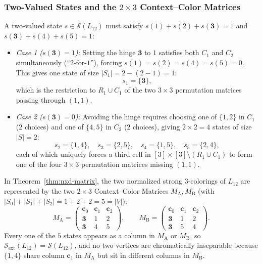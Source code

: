\documentclass[aps,pra,reprint,superscriptaddress,longbibliography,nofootinbib,floatfix,10pt]{revtex4-2}
\theoremstyle{definition}\newtheorem{definition}[theorem]{Definition}
\theoremstyle{remark}\newtheorem{remark}[theorem]{Remark}
\newcommand{\Sc}{\mathcal S}\newcommand{\Cc}{\mathcal C}
\begin{document}
\subsubsection{Two-Valued States and the \texorpdfstring{$2\times 3$}{2x3} Context--Color Matrices}
A two-valued state $s\in\Sc(L_{12})$ must satisfy $s(1)+s(2)+s(\mathbf{3})=1$ and $s(\mathbf{3})+s(4)+s(5)=1$:
\begin{itemize}
\item \emph{Case 1 ($s(\mathbf{3})=1$):} Setting the hinge $\mathbf{3}$ to $1$ satisfies both $C_1$ and $C_2$ simultaneously (``$2$-for-$1$''), forcing $s(1)=s(2)=s(4)=s(5)=0$. This gives one state of size $|S_1|=2-(2-1)=1$:
\[
s_1=\{\mathbf{3}\},
\]
which is the restriction to $R_1\cup C_1$ of the two $3\times 3$ permutation matrices passing through $(1,1)$.
\item \emph{Case 2 ($s(\mathbf{3})=0$):} Avoiding the hinge requires choosing one of $\{1,2\}$ in $C_1$ ($2$ choices) and one of $\{4,5\}$ in $C_2$ ($2$ choices), giving $2\times 2=4$ states of size $|S|=2$:
\[
s_2=\{1,4\},\quad s_3=\{2,5\},\quad s_4=\{1,5\},\quad s_5=\{2,4\},
\]
each of which uniquely forces a third cell in $[3]\times[3]\setminus(R_1\cup C_1)$ to form one of the four $3\times 3$ permutation matrices missing $(1,1)$.
\end{itemize}
In Theorem~\ref{thm:nxd-matrix}, the two normalized strong $3$-colorings of $L_{12}$ are represented by the two $2\times 3$ Context--Color Matrices $M_{\mathrm{A}},M_{\mathrm{B}}$ (with $|S_0|+|S_1|+|S_2|=1+2+2=5=|V|$):
\begin{equation}\label{eq:L12-matrices}
M_{\mathrm{A}}=\begin{pmatrix}
\mathbf{c}_0 & \mathbf{c}_1 & \mathbf{c}_2\\\hline
\mathbf{3} & 1 & 2\\
\mathbf{3} & 4 & 5
\end{pmatrix},\qquad
M_{\mathrm{B}}=\begin{pmatrix}
\mathbf{c}_0 & \mathbf{c}_1 & \mathbf{c}_2\\\hline
\mathbf{3} & 1 & 2\\
\mathbf{3} & 5 & 4
\end{pmatrix}.
\end{equation}
Every one of the $5$ states appears as a column in $M_{\mathrm{A}}$ or $M_{\mathrm{B}}$, so $\Sc_{\mathrm{ext}}(L_{12})=\Sc(L_{12})$, and no two vertices are chromatically inseparable because $\{1,4\}$ share column $\mathbf{c}_1$ in $M_{\mathrm{A}}$ but sit in different columns in $M_{\mathrm{B}}$.
\end{document}
